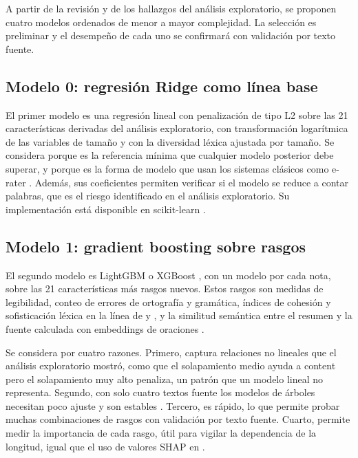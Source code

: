 \documentclass[11pt,a4paper]{article}
\begin{document}
A partir de la revisión y de los hallazgos del análisis exploratorio, se proponen cuatro modelos ordenados de menor a mayor complejidad. La selección es preliminar y el desempeño de cada uno se confirmará con validación por texto fuente.

\subsection{Modelo 0: regresión Ridge como línea base}

El primer modelo es una regresión lineal con penalización de tipo L2 \citep{hoerl1970} sobre las 21 características derivadas del análisis exploratorio, con transformación logarítmica de las variables de tamaño y con la diversidad léxica ajustada por tamaño. Se considera porque es la referencia mínima que cualquier modelo posterior debe superar, y porque es la forma de modelo que usan los sistemas clásicos como e-rater \citep{attali2006}. Además, sus coeficientes permiten verificar si el modelo se reduce a contar palabras, que es el riesgo identificado en el análisis exploratorio. Su implementación está disponible en scikit-learn \citep{pedregosa2011}.

\subsection{Modelo 1: gradient boosting sobre rasgos}

El segundo modelo es LightGBM \citep{ke2017} o XGBoost \citep{chen2016}, con un modelo por cada nota, sobre las 21 características más rasgos nuevos. Estos rasgos son medidas de legibilidad, conteo de errores de ortografía y gramática, índices de cohesión y sofisticación léxica en la línea de \citet{crossley2016} y \citet{kyle2018}, y la similitud semántica entre el resumen y la fuente calculada con embeddings de oraciones \citep{reimers2019}.

Se considera por cuatro razones. Primero, captura relaciones no lineales que el análisis exploratorio mostró, como que el solapamiento medio ayuda a content pero el solapamiento muy alto penaliza, un patrón que un modelo lineal no representa. Segundo, con solo cuatro textos fuente los modelos de árboles necesitan poco ajuste y son estables \citep{shwartz2022}. Tercero, es rápido, lo que permite probar muchas combinaciones de rasgos con validación por texto fuente. Cuarto, permite medir la importancia de cada rasgo, útil para vigilar la dependencia de la longitud, igual que el uso de valores SHAP en \citet{kumar2020}.
\end{document}
